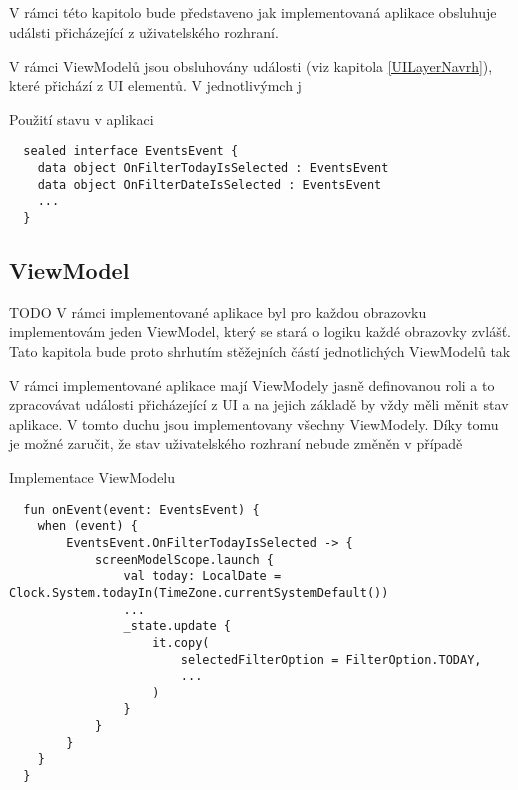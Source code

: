 \subsection{} \label{eventHandlingImpl}
V rámci této kapitolo bude představeno jak implementovaná aplikace obsluhuje událsti přicházející z uživatelského rozhraní.


V rámci ViewModelů jsou obsluhovány události (viz kapitola \ref{UILayerNavrh}), které přichází z UI elementů. V jednotlivýmch j


\begin{listing}[H]
\caption{Použití stavu v aplikaci}\label{lst:StateImpl}
\begin{verbatim}
  sealed interface EventsEvent {
    data object OnFilterTodayIsSelected : EventsEvent
    data object OnFilterDateIsSelected : EventsEvent
    ...
  }
\end{verbatim}
\end{listing}

\subsection{ViewModel} \label{ViewModelImpl}
TODO %
V rámci implementované aplikace byl pro každou obrazovku implementovám jeden ViewModel, který se stará o logiku každé obrazovky zvlášť. Tato kapitola 
bude proto shrhutím stěžejních částí jednotlichých ViewModelů tak 


V rámci implementované aplikace mají ViewModely jasně definovanou roli a to zpracovávat události přicházející z UI a na jejich základě by vždy měli
měnit stav aplikace. V tomto duchu jsou implementovany všechny ViewModely. Díky tomu je možné zaručit, že stav uživatelského rozhraní  nebude změněn
v případě 
\begin{listing}[H]
\caption{Implementace ViewModelu}\label{lst:ViewModelImpl}
\begin{verbatim}
  fun onEvent(event: EventsEvent) {
    when (event) {
        EventsEvent.OnFilterTodayIsSelected -> {
            screenModelScope.launch {
                val today: LocalDate = Clock.System.todayIn(TimeZone.currentSystemDefault())
                ...
                _state.update {
                    it.copy(
                        selectedFilterOption = FilterOption.TODAY,
                        ...
                    )
                }
            }
        }
    }
  }
\end{verbatim}
\end{listing}

